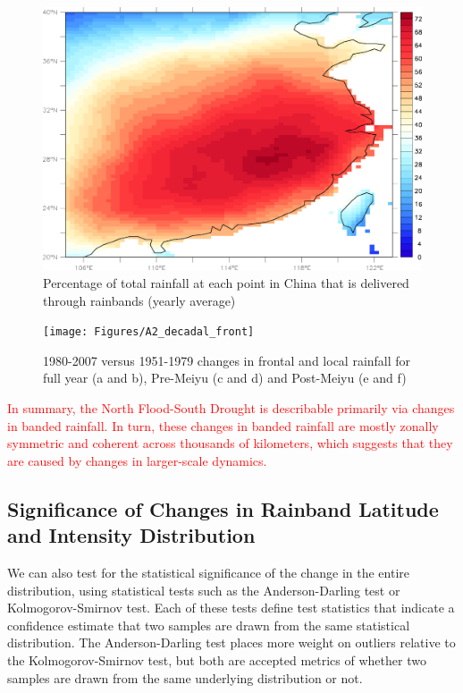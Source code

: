 \begin{figure}[htb]

\noindent\includegraphics[width=36pc]{Figures/A1_frontpct}
\caption{Percentage of total rainfall at each point in China that is delivered through rainbands (yearly average)}

\label{?}
\end{figure}


\begin{figure}[htb]

\noindent\texttt{[image: Figures/A2\_decadal\_front]}
\caption{1980-2007 versus 1951-1979 changes in frontal and local rainfall for full year (a and b), Pre-Meiyu (c and d) and Post-Meiyu (e and f)}
\end{figure}

\textcolor{red}{In summary, the North Flood-South Drought is describable primarily via changes in banded rainfall. In turn, these changes in banded rainfall are mostly zonally symmetric and coherent across thousands of kilometers, which suggests that they are caused by changes in larger-scale dynamics.}


\subsection{Significance of Changes in Rainband Latitude and Intensity Distribution}

We can also test for the statistical significance of the change in the entire distribution, using statistical tests such as the Anderson-Darling test or Kolmogorov-Smirnov test. Each of these tests define test statistics that indicate a confidence estimate that two samples are drawn from the same statistical distribution. The Anderson-Darling test places more weight on outliers relative to the Kolmogorov-Smirnov test, but both are accepted metrics of whether two samples are drawn from the same underlying distribution or not. 

